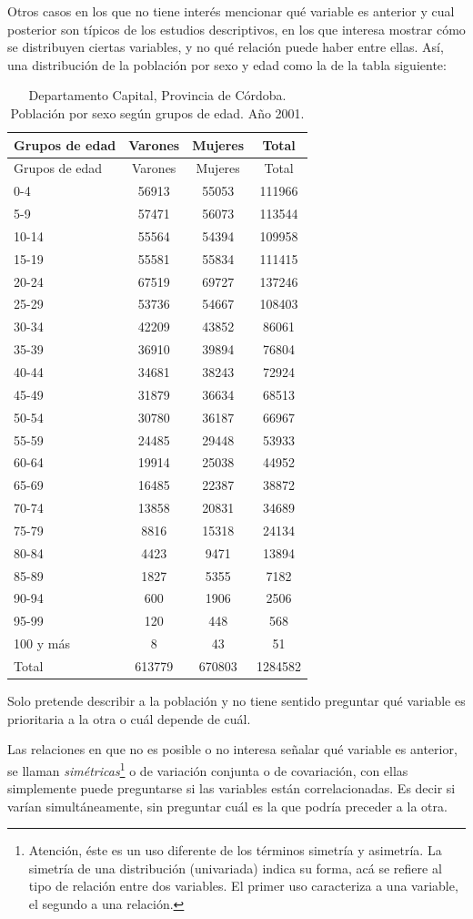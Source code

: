 \documentclass[]{book}
\let\rmarkdownfootnote\footnote%
\def\footnote{\protect\rmarkdownfootnote}
\begin{document}
Otros casos en los que no tiene interés mencionar qué variable es
anterior y cual posterior son típicos de los estudios descriptivos, en
los que interesa mostrar cómo se distribuyen ciertas variables, y no qué
relación puede haber entre ellas. Así, una distribución de la población por sexo y edad como la de la tabla siguiente:

\begin{longtable}[]{@{}lccc@{}}
\caption{\label{tab:unnamed-chunk-105}Departamento Capital, Provincia de Córdoba. Población por sexo según grupos de edad. Año 2001.}\tabularnewline
\toprule
Grupos de edad & Varones & Mujeres & Total\tabularnewline
\midrule
\endfirsthead
\toprule
Grupos de edad & Varones & Mujeres & Total\tabularnewline
\midrule
\endhead
0-4 & 56913 & 55053 & 111966\tabularnewline
5-9 & 57471 & 56073 & 113544\tabularnewline
10-14 & 55564 & 54394 & 109958\tabularnewline
15-19 & 55581 & 55834 & 111415\tabularnewline
20-24 & 67519 & 69727 & 137246\tabularnewline
25-29 & 53736 & 54667 & 108403\tabularnewline
30-34 & 42209 & 43852 & 86061\tabularnewline
35-39 & 36910 & 39894 & 76804\tabularnewline
40-44 & 34681 & 38243 & 72924\tabularnewline
45-49 & 31879 & 36634 & 68513\tabularnewline
50-54 & 30780 & 36187 & 66967\tabularnewline
55-59 & 24485 & 29448 & 53933\tabularnewline
60-64 & 19914 & 25038 & 44952\tabularnewline
65-69 & 16485 & 22387 & 38872\tabularnewline
70-74 & 13858 & 20831 & 34689\tabularnewline
75-79 & 8816 & 15318 & 24134\tabularnewline
80-84 & 4423 & 9471 & 13894\tabularnewline
85-89 & 1827 & 5355 & 7182\tabularnewline
90-94 & 600 & 1906 & 2506\tabularnewline
95-99 & 120 & 448 & 568\tabularnewline
100 y más & 8 & 43 & 51\tabularnewline
Total & 613779 & 670803 & 1284582\tabularnewline
\bottomrule
\end{longtable}

Solo pretende describir a la población y no tiene sentido preguntar qué variable es prioritaria a la otra o cuál depende de cuál.

Las relaciones en que no es posible o no interesa señalar qué variable
es anterior, se llaman \emph{simétricas}\footnote{Atención, éste es un uso diferente de los términos simetría y asimetría. La simetría de una distribución (univariada) indica su forma, acá se refiere al tipo de relación entre dos variables. El primer uso caracteriza a una variable, el segundo a una relación.} o de variación conjunta o de
covariación, con ellas simplemente puede preguntarse si las variables
están correlacionadas. Es decir si varían simultáneamente, sin
preguntar cuál es la que podría preceder a la otra.
\end{document}
